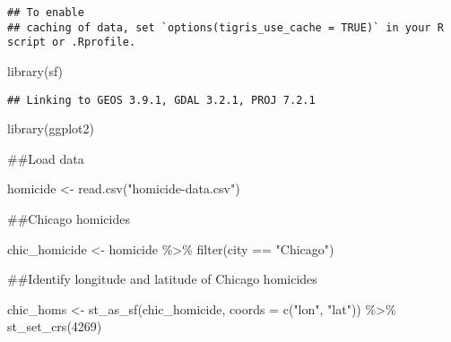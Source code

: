 \documentclass[
]{article}
\newenvironment{Shaded}{\begin{snugshade}}{\end{snugshade}}
\newcommand{\AttributeTok}[1]{\textcolor[rgb]{0.77,0.63,0.00}{#1}}
\newcommand{\DecValTok}[1]{\textcolor[rgb]{0.00,0.00,0.81}{#1}}
\newcommand{\FunctionTok}[1]{\textcolor[rgb]{0.00,0.00,0.00}{#1}}
\newcommand{\NormalTok}[1]{#1}
\newcommand{\OtherTok}[1]{\textcolor[rgb]{0.56,0.35,0.01}{#1}}
\newcommand{\SpecialCharTok}[1]{\textcolor[rgb]{0.00,0.00,0.00}{#1}}
\newcommand{\StringTok}[1]{\textcolor[rgb]{0.31,0.60,0.02}{#1}}
\begin{document}
\begin{verbatim}
## To enable 
## caching of data, set `options(tigris_use_cache = TRUE)` in your R script or .Rprofile.
\end{verbatim}

\begin{Shaded}
\begin{Highlighting}[]
\FunctionTok{library}\NormalTok{(sf)}
\end{Highlighting}
\end{Shaded}

\begin{verbatim}
## Linking to GEOS 3.9.1, GDAL 3.2.1, PROJ 7.2.1
\end{verbatim}

\begin{Shaded}
\begin{Highlighting}[]
\FunctionTok{library}\NormalTok{(ggplot2)}
\end{Highlighting}
\end{Shaded}

\#\#Load data

\begin{Shaded}
\begin{Highlighting}[]
\NormalTok{homicide }\OtherTok{\textless{}{-}} \FunctionTok{read.csv}\NormalTok{(}\StringTok{"homicide{-}data.csv"}\NormalTok{)}
\end{Highlighting}
\end{Shaded}

\#\#Chicago homicides

\begin{Shaded}
\begin{Highlighting}[]
\NormalTok{chic\_homicide }\OtherTok{\textless{}{-}}\NormalTok{ homicide }\SpecialCharTok{\%\textgreater{}\%}
  \FunctionTok{filter}\NormalTok{(city }\SpecialCharTok{==} \StringTok{"Chicago"}\NormalTok{)}
\end{Highlighting}
\end{Shaded}

\#\#Identify longitude and latitude of Chicago homicides

\begin{Shaded}
\begin{Highlighting}[]
\NormalTok{chic\_homs }\OtherTok{\textless{}{-}} \FunctionTok{st\_as\_sf}\NormalTok{(chic\_homicide, }\AttributeTok{coords =} \FunctionTok{c}\NormalTok{(}\StringTok{"lon"}\NormalTok{, }\StringTok{"lat"}\NormalTok{)) }\SpecialCharTok{\%\textgreater{}\%}
  \FunctionTok{st\_set\_crs}\NormalTok{(}\DecValTok{4269}\NormalTok{)}
\end{Highlighting}
\end{Shaded}
\end{document}
